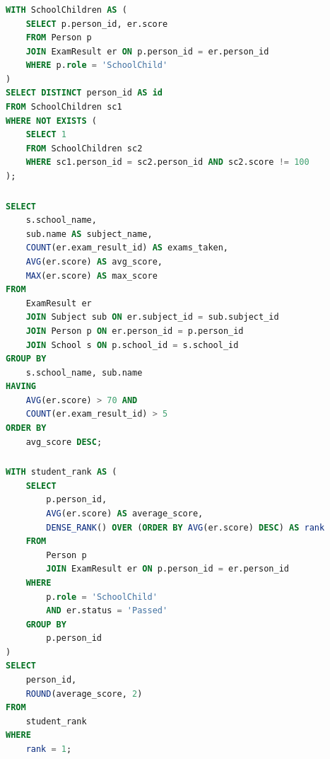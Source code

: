 \documentclass[a4paper]{article}
\begin{document}
\subsubsection{}
\label{subsec:sql6}
\begin{lstlisting}[language=SQL, label={lst:sql6}, frame=none, numbers=none, caption={SQL-запрос 6}]
WITH SchoolChildren AS (
    SELECT p.person_id, er.score
    FROM Person p
    JOIN ExamResult er ON p.person_id = er.person_id
    WHERE p.role = 'SchoolChild'
)
SELECT DISTINCT person_id AS id
FROM SchoolChildren sc1
WHERE NOT EXISTS (
    SELECT 1 
    FROM SchoolChildren sc2 
    WHERE sc1.person_id = sc2.person_id AND sc2.score != 100
);
            \end{lstlisting}

\subsubsection{}
\label{subsec:sql7}
\begin{lstlisting}[language=SQL, label={lst:sql7}, frame=none, numbers=none, caption={SQL-запрос 7}]
SELECT 
    s.school_name,
    sub.name AS subject_name,
    COUNT(er.exam_result_id) AS exams_taken,
    AVG(er.score) AS avg_score,
    MAX(er.score) AS max_score
FROM 
    ExamResult er
    JOIN Subject sub ON er.subject_id = sub.subject_id
    JOIN Person p ON er.person_id = p.person_id
    JOIN School s ON p.school_id = s.school_id
GROUP BY 
    s.school_name, sub.name
HAVING 
    AVG(er.score) > 70 AND
    COUNT(er.exam_result_id) > 5
ORDER BY 
    avg_score DESC;
            \end{lstlisting}
\subsubsection{}
\label{subsec:sql8}
\begin{lstlisting}[language=SQL, label={lst:sql8}, frame=none, numbers=none, caption={SQL-запрос 8}]
WITH student_rank AS (
    SELECT 
        p.person_id,
        AVG(er.score) AS average_score,
        DENSE_RANK() OVER (ORDER BY AVG(er.score) DESC) AS rank
    FROM 
        Person p
        JOIN ExamResult er ON p.person_id = er.person_id
    WHERE 
        p.role = 'SchoolChild'
        AND er.status = 'Passed'
    GROUP BY 
        p.person_id
)
SELECT 
    person_id,
    ROUND(average_score, 2)
FROM 
    student_rank
WHERE 
    rank = 1;
            \end{lstlisting}
\end{document}
